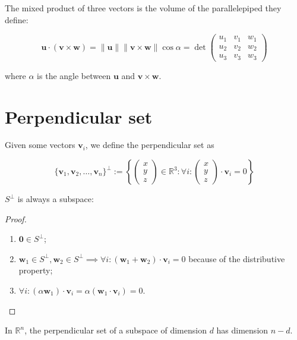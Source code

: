 \documentclass[12pt,a4paper]{report}
\newcommand{\norm}[1]{\left\lVert#1\right\rVert}
\numberwithin{equation}{section}
\theoremstyle{definition}
\theoremstyle{remark}
\begin{document}
The mixed product of three vectors is the volume of the parallelepiped they define:

\begin{equation}
\mathbf{u} \cdot (\mathbf{v}\times\mathbf{w}) =
\norm{\mathbf{u}} \norm{\mathbf{v} \times \mathbf{w}}\cos \alpha
=\det \begin{pmatrix}
u_1 & v_1 & w_1 \\
u_2 & v_2 & w_2 \\
u_3 & v_3 & w_3
\end{pmatrix}
\end{equation}

where $\alpha$ is the angle between $\mathbf{u}$ and $\mathbf{v}\times\mathbf{w}$.

\section{Perpendicular set}

Given some vectors $\mathbf{v}_i$, we define the perpendicular set as

\begin{equation}
\lbrace \mathbf{v}_1, \mathbf{v}_2, \dots, \mathbf{v}_n\rbrace ^\perp := \left\lbrace \begin{pmatrix}
x\\y\\z
\end{pmatrix}\in \mathbb{R}^3: \forall i: \begin{pmatrix}
x\\y\\z
\end{pmatrix} \cdot \mathbf{v}_i =0\right\rbrace
\end{equation}

$S^\perp$ is always a subspace:

\begin{proof}
\begin{enumerate}
\item $\mathbf{0} \in S^\perp$;
\item $\mathbf{w}_1 \in S^\perp, \mathbf{w}_2 \in S^\perp \implies \forall i: (\mathbf{w}_1 + \mathbf{w}_2)\cdot \mathbf{v}_i = 0$ because of the distributive property;
\item $\forall i: (\alpha \mathbf{w}_1) \cdot \mathbf{v}_i = \alpha (\mathbf{w}_1 \cdot \mathbf{v}_i) = 0$.
\end{enumerate}
\end{proof}

In $\mathbb{R}^n$, the perpendicular set of a subspace of dimension $d$ has dimension $n-d$.

\tableofcontents
\end{document}
